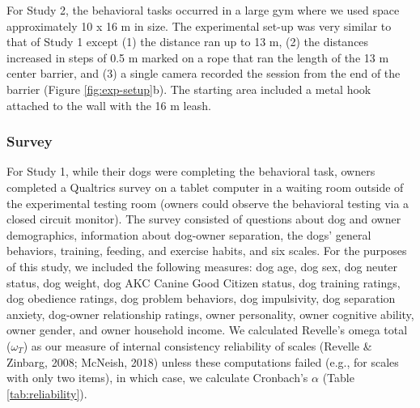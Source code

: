 \documentclass[
  pub,floatsintext]{apa6}
\begin{document}
For Study 2, the behavioral tasks occurred in a large gym where we used space approximately 10 x 16 m in size. The experimental set-up was very similar to that of Study 1 except (1) the distance ran up to 13 m, (2) the distances increased in steps of 0.5 m marked on a rope that ran the length of the 13 m center barrier, and (3) a single camera recorded the session from the end of the barrier (Figure \ref{fig:exp-setup}b). The starting area included a metal hook attached to the wall with the 16 m leash.

\hypertarget{survey}{%
\subsubsection{Survey}\label{survey}}

For Study 1, while their dogs were completing the behavioral task, owners completed a Qualtrics survey on a tablet computer in a waiting room outside of the experimental testing room (owners could observe the behavioral testing via a closed circuit monitor). The survey consisted of questions about dog and owner demographics, information about dog-owner separation, the dogs' general behaviors, training, feeding, and exercise habits, and six scales. For the purposes of this study, we included the following measures: dog age, dog sex, dog neuter status, dog weight, dog AKC Canine Good Citizen status, dog training ratings, dog obedience ratings, dog problem behaviors, dog impulsivity, dog separation anxiety, dog-owner relationship ratings, owner personality, owner cognitive ability, owner gender, and owner household income. We calculated Revelle's omega total (\(\omega_{T}\)) as our measure of internal consistency reliability of scales (Revelle \& Zinbarg, 2008; McNeish, 2018) unless these computations failed (e.g., for scales with only two items), in which case, we calculate Cronbach's \(\alpha\) (Table \ref{tab:reliability}).
\end{document}
